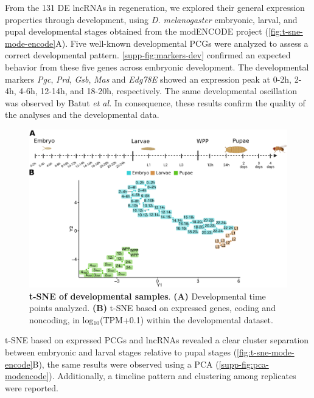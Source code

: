 From the 131 DE lncRNAs in regeneration, we explored their general expression properties through development, using \textit{D. melanogaster} embryonic, larval, and pupal developmental stages obtained from the modENCODE project\autocite{celniker_2009,modencode_2010} (\autoref{fig:t-sne-mode-encode}A). Five well-known developmental PCGs were analyzed to assess a correct developmental pattern.\autocite{batut_2017} \autoref{supp-fig:markers-dev} confirmed an expected behavior from these five genes across embryonic development. The developmental markers \textit{Pgc}, \textit{Prd}, \textit{Gsb}, \textit{Mas} and \textit{Edg78E} showed an expression peak at 0-2h, 2-4h, 4-6h, 12-14h, and 18-20h, respectively. The same developmental oscillation was observed by Batut \textit{et al.}\autocite{batut_2017} In consequence, these results confirm the quality of the analyses and the developmental data.

\begin{figure}[ht!]
  \centering
  \includegraphics[scale=0.6]{plots/results/dme/modencode.fist.fig.pdf}
  \caption[t-SNE of developmental samples]{\textbf{t-SNE of developmental samples}. \textbf{(A)} Developmental time points analyzed. \textbf{(B)} t-SNE based on expressed genes, coding and noncoding, in log$_{10}$(TPM+0.1) within the developmental dataset.}
  \label{fig:t-sne-mode-encode}
\end{figure}

t-SNE based on expressed PCGs and lncRNAs revealed a clear cluster separation between embryonic and larval stages relative to pupal stages (\autoref{fig:t-sne-mode-encode}B), the same results were observed using a PCA (\autoref{supp-fig:pca-modencode}). Additionally, a timeline pattern and clustering among replicates were reported. 

